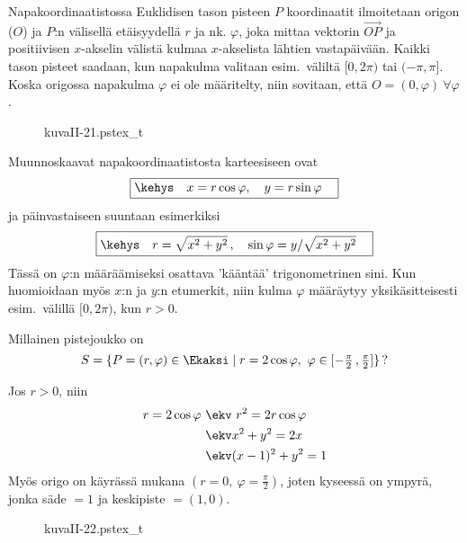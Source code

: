 Napakoordinaatistossa Euklidisen tason pisteen $P$ koordinaatit ilmoitetaan origon ($O$) ja 
$P$:n välisellä etäisyydellä $r$ ja nk.  $\varphi$, joka mittaa vektorin 
$\overrightarrow{OP}$ ja positiivisen $x$-akselin välistä kulmaa $x$-akselista lähtien 
vastapäivään. Kaikki tason pisteet saadaan, kun napakulma valitaan esim.\ väliltä $[0,2\pi)$ tai
$(-\pi,\pi]$. Koska origossa napakulma $\varphi$ ei ole määritelty, niin sovitaan, että
$O=(0,\varphi)\ \forall\varphi$.
\begin{figure}[H]
\begin{center}
{kuvaII-21.pstex_t}
\end{center}
\end{figure}
Muunnoskaavat napakoordinaatistosta karteesiseen ovat
\[
\boxed{\kehys\quad x=r\cos{\varphi}, \quad y=r\sin{\varphi} \quad}
\]
ja päinvastaiseen suuntaan esimerkiksi
\[
\boxed{\kehys\quad r=\sqrt{x^2 + y^2}\,, \quad \sin{\varphi}=y/\sqrt{x^2 + y^2} \quad}
\]
Tässä on $\varphi$:n määräämiseksi osattava 'kääntää' trigonometrinen sini. Kun huomioidaan myös
$x$:n ja $y$:n etumerkit, niin kulma $\varphi$ määräytyy yksikäsitteisesti esim.\ välillä 
$[0,2\pi)$, kun $r>0$. 
\begin{Exa}
Millainen pistejoukko on
\[
S=\{P=(r,\varphi) \in \Ekaksi \mid r=2\cos\varphi, \ 
                   \varphi\in[-\tfrac{\pi}{2}\,,\tfrac{\pi}{2}]\}\,?
\]
\end{Exa}
\ratk Jos $r > 0$, niin
\begin{align*}
r=2\cos{\varphi} \ &\ekv \ r^2=2r\cos{\varphi} \\
&\ekv x^2+y^2=2x \\
&\ekv (x-1)^2+y^2=1
\end{align*}
Myös origo on käyrässä mukana $(r=0, \ \varphi=\frac{\pi}{2})$, joten kyseessä on ympyrä, jonka
säde $=1$ ja keskipiste $=(1,0)$. \loppu
\begin{figure}[H]
\begin{center}
{kuvaII-22.pstex_t}
\end{center}
\end{figure}

